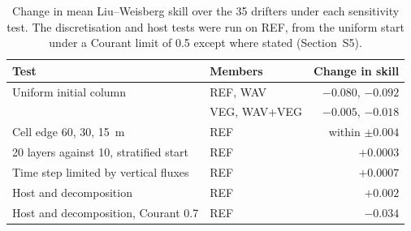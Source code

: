 \begin{table}[H]
  \centering
  \caption{Change in mean Liu--Weisberg skill over the 35 drifters under each
  sensitivity test. The discretisation and host tests were run on
  REF, from the uniform start under a Courant limit of 0.5 except
  where stated (Section~S5).}
  \label{tab:sensitivity}
  \begin{tabular}{llr}
    \toprule
    Test & Members & Change in skill \\
    \midrule
    Uniform initial column       & REF, WAV & $-0.080$, $-0.092$ \\
                                 & VEG, WAV+VEG     & $-0.005$, $-0.018$ \\
    Cell edge 60, 30, 15~m       & REF & within $\pm 0.004$ \\
    20 layers against 10, stratified start & REF & $+0.0003$ \\
    Time step limited by vertical fluxes   & REF & $+0.0007$ \\
    Host and decomposition       & REF & $+0.002$ \\
    Host and decomposition, Courant 0.7 & REF & $-0.034$ \\
    \bottomrule
  \end{tabular}
\end{table}
